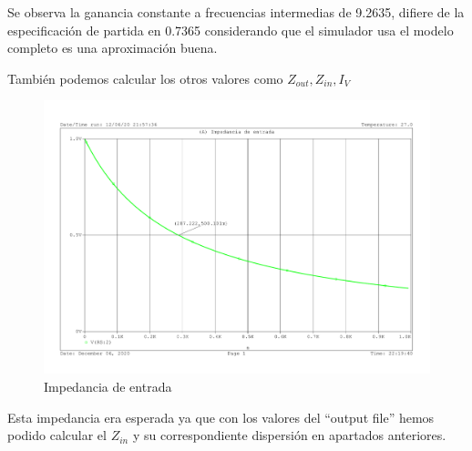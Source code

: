 Se observa la ganancia constante a frecuencias intermedias de 9.2635,
difiere de la especificación de partida en 0.7365 considerando que el
simulador usa el modelo completo es una aproximación buena.

También podemos calcular los otros valores como $Z_{out},Z_{in},I_V$
    \begin{figure}[H]
    \centering  
    \includegraphics[scale=0.45,page=1,trim]{images/problema_puntuable_5.pdf}
    \caption{Impedancia de entrada}
  \end{figure}
  Esta impedancia era esperada ya que con los valores del ``output
  file'' hemos podido calcular el $Z_{in}$ y su correspondiente
  dispersión en apartados anteriores.
  
